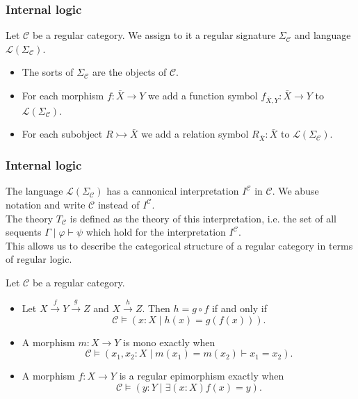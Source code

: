 \documentclass[14pt]{beamer}
\theoremstyle{plain}
\begin{document}
  \begin{frame}
    \frametitle{Internal logic}
    Let $\mathcal{C}$ be a regular category. We assign to it a regular signature
    $\Sigma_{\mathcal{C}}$ and language $\mathcal{L}(\Sigma_{\mathcal{C}})$.
    \pause
    \vspace{1em}
    \begin{itemize}
      \item The sorts of $\Sigma_{\mathcal{C}}$ are the objects of $\mathcal{C}$.
      \pause
      \vspace{1em}
      \item For each morphism $f : \bar{X} \to Y$ we add a function symbol
        $f_{\bar{X},Y} : \bar{X} \to Y$ to $\mathcal{L}(\Sigma_{\mathcal{C}})$.
      \pause
      \vspace{1em}
      \item For each subobject $R \rightarrowtail \bar{X}$ we add a relation symbol
        $R_{\bar{X}} : \bar{X}$ to $\mathcal{L}(\Sigma_{\mathcal{C}})$.
    \end{itemize}
  \end{frame}

  \begin{frame}
    \frametitle{Internal logic}
    The language $\mathcal{L}(\Sigma_{\mathcal{C}})$ has a cannonical interpretation
    $I^{\mathcal{C}}$ in $\mathcal{C}$. We abuse notation and write $\mathcal{C}$
    instead of $I^{\mathcal{C}}$.
    \vspace{1em}
    \pause \\
    The theory $T_{\mathcal{C}}$ is defined as the theory of this interpretation\pause ,
    i.e. the set of all sequents $\Gamma \mid \varphi \vdash \psi$ which hold for
    the interpretation $I^{\mathcal{C}}$.
    \vspace{1em}
    \pause \\
    This allows us to describe the categorical structure of a regular category in
    terms of regular logic.
  \end{frame}

  \begin{frame}
    \begin{lemma}
      Let $\mathcal{C}$ be a regular category.
      \begin{itemize}
      \item<2-> Let $X \xrightarrow{f} Y \xrightarrow{g} Z$ and
        $X \xrightarrow{h} Z$.  Then $h = g \circ f$
        if and only if
        \[{\mathcal{C} \models (x:X \mid  h(x) = g(f(x)))}.\]
      \item<3-> A morphism $m : X \to Y$ is mono exactly when
        \[\mathcal{C} \models (x_1,x_2:X \mid m(x_1) = m(x_2) \vdash x_1 = x_2). \]
      \item<4-> A morphism $f : X \to Y$ is a regular epimorphism exactly when
        \[ \mathcal{C} \models (y:Y \mid \exists (x:X) f(x) = y). \]
      \end{itemize}
    \end{lemma}
  \end{frame}
\end{document}
